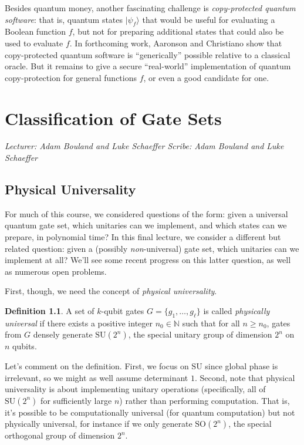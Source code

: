 \documentclass[12pt]{report}
\theoremstyle{plain}
\theoremstyle{definition}
\newtheorem{definition}[theorem]{Definition}
\newcommand{\N}{{\mathbb N}}
\renewcommand{\ket}[1]{|#1\rangle}
\newcommand{\lecture}[3]{%
  \chapter{#3}%
  \vspace{-5ex}%
  \textit{Lecturer: #1 \hfill Scribe: #2}\par%
  \vspace{1ex}\titlerule\vspace{2ex}}
\begin{document}
Besides quantum money, another fascinating challenge is {\em copy-protected quantum software}: that is, quantum states $\ket{\psi_f}$ that would be useful for evaluating a Boolean function $f$, but not for preparing additional states that could also be used to evaluate $f$.  In forthcoming work, Aaronson and Christiano show that copy-protected quantum software is ``generically'' possible relative to a classical oracle.  But it remains to give a secure ``real-world'' implementation of quantum copy-protection for general functions $f$, or even a good candidate for one.

\lecture{Adam Bouland and Luke Schaeffer}{Adam Bouland and Luke Schaeffer}{Classification of Gate Sets}

\section{Physical Universality}

For much of this course, we considered questions of the form: given a universal quantum gate set, which unitaries can we implement, and which states can we prepare, in polynomial time?  In this final lecture, we consider a different but related question: given a (possibly \emph{non}-universal) gate set, which unitaries can we implement at all?  We'll see some recent progress on this latter question, as well as numerous open problems.

First, though, we need the concept of {\em physical universality}.

\begin{definition}
A set of $k$-qubit gates $G = \{ g_1, \ldots, g_\ell \}$ is called \emph{physically universal} if there exists a positive integer $n_0 \in \N$ such that for all $n \geq n_0$, gates from $G$ densely generate $\mathrm{SU}(2^n)$, the special unitary group of dimension $2^n$ on $n$ qubits.
\end{definition}

Let's comment on the definition.  First, we focus on $\mathrm{SU}$ since global phase is irrelevant, so we might as well assume determinant $1$.  Second, note that physical universality is about implementing unitary operations (specifically, all of $\mathrm{SU}(2^n)$ for sufficiently large $n$) rather than performing computation. That is, it's possible to be computationally universal (for quantum computation) but not physically universal, for instance if we only generate $\mathrm{SO}(2^n)$, the special orthogonal group of dimension $2^n$.
\end{document}
